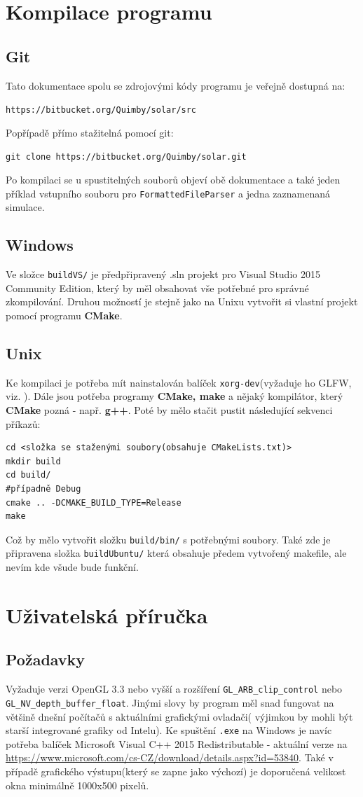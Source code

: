 \chapter{Kompilace programu}
\label{chap:kompilace}
\section{Git}
Tato dokumentace spolu se zdrojovými kódy programu je veřejně dostupná na:
\begin{center}
	\texttt{https://bitbucket.org/Quimby/solar/src}
\end{center}
Popřípadě přímo stažitelná pomocí git:
\begin{center}
\texttt{git clone https://bitbucket.org/Quimby/solar.git}
\end{center}
Po kompilaci se u spustitelných souborů objeví obě dokumentace a také jeden příklad vstupního souboru pro \texttt{FormattedFileParser} a jedna zaznamenaná simulace.
\section{Windows}
Ve složce \texttt{buildVS/} je předpřipravený .sln projekt pro Visual Studio 2015 Community Edition, který by měl obsahovat vše potřebné pro správné zkompilování. Druhou možností je stejně jako na Unixu vytvořit si vlastní projekt pomocí programu \textbf{CMake}.
\section{Unix}
Ke kompilaci je potřeba mít nainstalován balíček \texttt{xorg-dev}(vyžaduje ho GLFW, viz. \cite{GLFW}). Dále jsou potřeba programy \textbf{CMake, make} a nějaký kompilátor, který \textbf{CMake} pozná - např. \textbf{g++}. Poté by mělo stačit pustit následující sekvenci příkazů:
\begin{lstlisting}
cd <složka se staženými soubory(obsahuje CMakeLists.txt)>
mkdir build
cd build/
#případně Debug
cmake .. -DCMAKE_BUILD_TYPE=Release 
make
\end{lstlisting}
Což by mělo vytvořit složku \lstinline|build/bin/| s potřebnými soubory. Také zde je připravena složka \texttt{buildUbuntu/} která obsahuje předem vytvořený makefile, ale nevím kde všude bude funkční.
\chapter{Uživatelská příručka}
\label{chap:userGuide}
\section{Požadavky}
Vyžaduje verzi OpenGL 3.3 nebo vyšší a rozšíření  \texttt{GL\_ARB\_clip\_control} nebo \texttt{GL\_NV\_depth\_buffer\_float}. Jinými slovy by program měl snad fungovat na většině dnešní počítačů s aktuálními grafickými ovladači( výjimkou by mohli být starší integrované grafiky od Intelu). Ke spuštění \texttt{.exe} na Windows je navíc potřeba balíček Microsoft Visual C++ 2015 Redistributable - aktuální verze na \url{https://www.microsoft.com/cs-CZ/download/details.aspx?id=53840}.
Také v případě grafického výstupu(který se zapne jako výchozí) je doporučená velikost okna minimálně 1000x500 pixelů.
